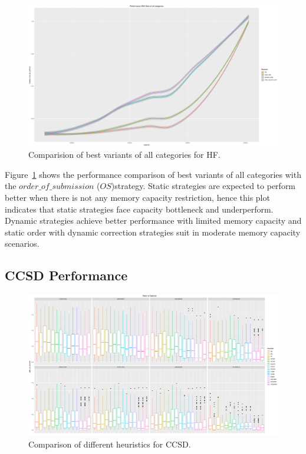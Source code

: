 \documentclass[sigconf]{acmart}
\begin{document}
{	
	\begin{figure}[htb]
		\includegraphics[scale=0.15]{./results/plots/inverse_ratio_to_optimal_hf-best.pdf}
		\caption{Comparision of best variants of all categories for HF.}
		\label{fig:ratio_to_optimal_best_hf}
	\end{figure}
	
	
	Figure~\ref{fig:ratio_to_optimal_best_hf} shows the performance comparison of best variants of all categories with the $order\_of\_submission$ ($OS$)strategy. Static strategies are expected to perform better when there is not any memory capacity restriction, hence this plot indicates that static strategies face capacity bottleneck and underperform. Dynamic strategies achieve better performance with limited memory capacity and static order with dynamic correction strategies suit in moderate memory capacity scenarios.
	
	\subsection{CCSD Performance}
	

	\begin{figure}[htb]
	\includegraphics[scale=0.25]{./all-binpack/ratio_to_optimal_selected_ccsd.pdf}
	\caption{Comparison of different heuristics for CCSD.}
	\label{fig:ratio_to_optimal_ccsd}
\end{figure}	
	
}
\end{document}
